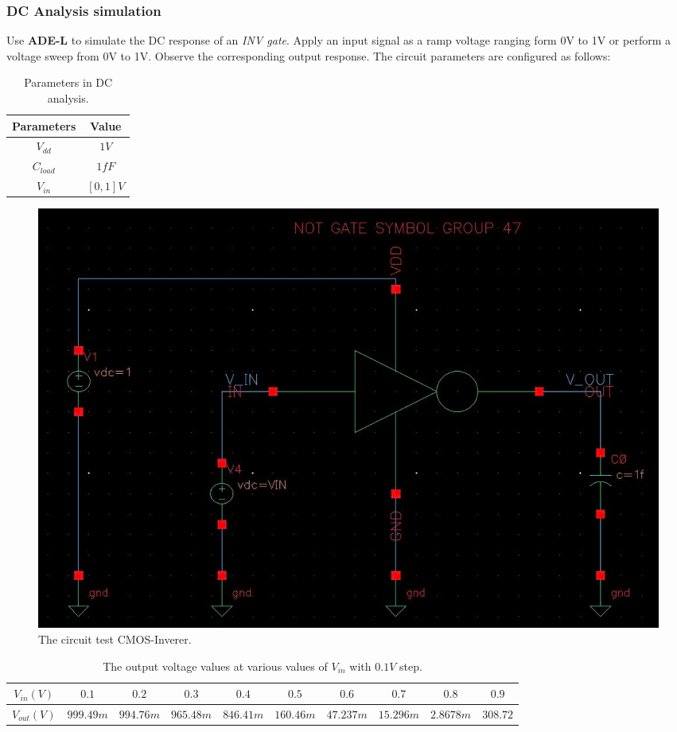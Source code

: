 \subsubsection{DC Analysis simulation}

Use \textbf{ADE-L} to simulate the DC response of an \textit{INV gate}. Apply an input signal as a ramp voltage ranging form 0V to 1V or perform a voltage sweep from 0V to 1V. Observe the corresponding output response. The circuit parameters are configured as follows:

\begin{table}[H]
	\centering
	\begin{tabular}{|c|c|}
		\hline
		Parameters & Value \\
		\hline
		$V_{dd}$ & $1V$ \\
		\hline
		$C_{load}$ & $1fF$\\
		\hline
		$V_{in}$ & $[0, 1] V$\\
		\hline
	\end{tabular}
	\caption{Parameters in DC analysis.}
\end{table}

\begin{figure}[H]
	\centering
	\includegraphics[width=.6\linewidth]{section/EX1/INV/EX1_INV_DCanalysis_schematic.png}
	\caption{The circuit test CMOS-Inverer.}
\end{figure}

\begin{table}[H]
	\centering
	\begin{tabular}{|c|c|c|c|c|c|c|c|c|c|}
		\hline
		$V_{in}(V)$ & $0.1$ & $0.2$ & $0.3$ & $0.4$ & $0.5$ & $0.6$ & $0.7$ & $0.8$ & $0.9$ \\
		\hline
		$V_{out}(V)$ & $999.49m$ & $994.76m$ & $965.48m$ & $846.41m$ & $160.46m$ & $47.237m$ & $15.296m$ & $2.8678m$ & $308.72$ \\
		\hline
	\end{tabular}
	\caption{The output voltage values at various values of $V_{in}$ with $0.1V$ step.}
\end{table}

